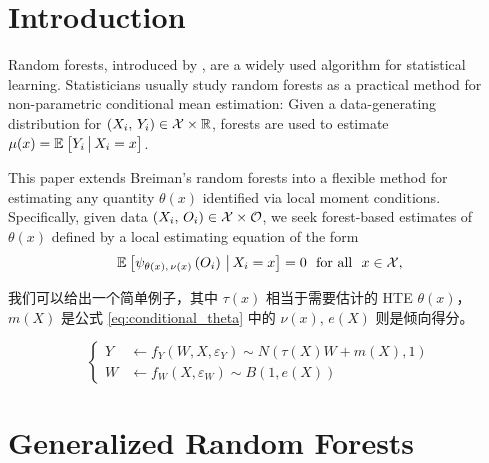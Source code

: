 \documentclass[aos]{imsart}
\theoremstyle{plain}
\theoremstyle{definition}
\theoremstyle{remark}
\begin{document}
\begin{CJK}{UTF8}{gbsn}
\newpage


\section{Introduction}

Random forests, introduced by \citet{breiman2001random}, are a widely used algorithm for statistical learning.
Statisticians usually study random forests as a practical method for non-parametric conditional mean estimation:
Given a data-generating distribution for $(X_i, \, Y_i) \in \mathcal{X} \times \mathbb{R}$, forests are used to estimate $\mu(x) = \mathbb{E}_{}\left[Y_i \,\big|\, X_i = x\right]$.

This paper extends Breiman's random forests into a flexible
method for estimating any quantity $\theta(x)$ identified via local moment conditions. Specifically,
given data $(X_i, \, O_i) \in \mathcal{X} \times \mathcal{O}$, we seek forest-based estimates of $\theta(x)$ defined by a local
estimating equation of the form
\begin{equation}
\label{eq:conditional_theta}
\EE{\psi_{\theta(x), \, \nu(x)}\p{O_i} \cond X_i = x} = 0 \ \text{ for all } \ x \in \xx, 
\end{equation}


我们可以给出一个简单例子，其中 $\tau(x)$ 相当于需要估计的 HTE $\theta(x)$，$m(X)$ 是公式 \ref{eq:conditional_theta} 中的 $\nu(x)$, $e(X)$ 则是倾向得分。

$$
\begin{cases}
Y &\leftarrow  f_Y(W, X, \varepsilon_Y) \sim N(\tau(X) W + m(X), 1) \\
W &\leftarrow f_W(X , \varepsilon_W) \sim B(1,  e(X))
\end{cases}
$$




\section{Generalized Random Forests}


\end{CJK}
\end{document}
